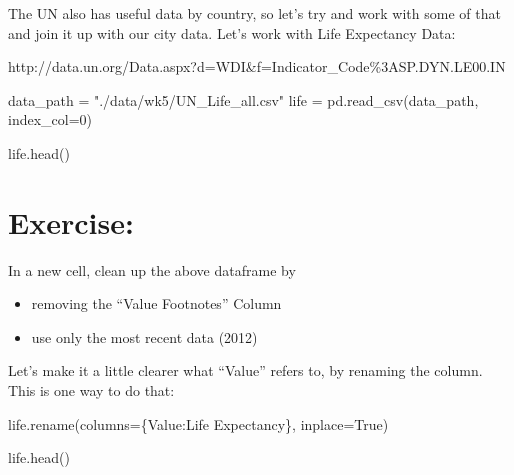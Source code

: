 \documentclass[
  letterpaper,
  DIV=11,
  numbers=noendperiod]{scrreprt}
\newenvironment{Shaded}{\begin{snugshade}}{\end{snugshade}}
\newcommand{\DecValTok}[1]{\textcolor[rgb]{0.68,0.00,0.00}{#1}}
\newcommand{\NormalTok}[1]{\textcolor[rgb]{0.00,0.23,0.31}{#1}}
\newcommand{\OperatorTok}[1]{\textcolor[rgb]{0.37,0.37,0.37}{#1}}
\newcommand{\StringTok}[1]{\textcolor[rgb]{0.13,0.47,0.30}{#1}}
\newcommand{\VariableTok}[1]{\textcolor[rgb]{0.07,0.07,0.07}{#1}}
\providecommand{\tightlist}{%
  \setlength{\itemsep}{0pt}\setlength{\parskip}{0pt}}\usepackage{longtable,booktabs,array}
\begin{document}
The UN also has useful data by country, so let's try and work with some
of that and join it up with our city data. Let's work with Life
Expectancy Data:

http://data.un.org/Data.aspx?d=WDI\&f=Indicator\_Code\%3ASP.DYN.LE00.IN

\begin{Shaded}
\begin{Highlighting}[]
\NormalTok{data\_path }\OperatorTok{=} \StringTok{"./data/wk5/UN\_Life\_all.csv"}
\NormalTok{life }\OperatorTok{=}\NormalTok{ pd.read\_csv(data\_path, index\_col}\OperatorTok{=}\DecValTok{0}\NormalTok{)}
\end{Highlighting}
\end{Shaded}

\begin{Shaded}
\begin{Highlighting}[]
\NormalTok{life.head()}
\end{Highlighting}
\end{Shaded}

\hypertarget{exercise-20}{%
\section{Exercise:}\label{exercise-20}}

In a new cell, clean up the above dataframe by

\begin{itemize}
\tightlist
\item
  removing the ``Value Footnotes'' Column
\item
  use only the most recent data (2012)
\end{itemize}

Let's make it a little clearer what ``Value'' refers to, by renaming the
column. This is one way to do that:

\begin{Shaded}
\begin{Highlighting}[]
\NormalTok{life.rename(columns}\OperatorTok{=}\NormalTok{\{}\StringTok{\textquotesingle{}Value\textquotesingle{}}\NormalTok{:}\StringTok{\textquotesingle{}Life Expectancy\textquotesingle{}}\NormalTok{\}, inplace}\OperatorTok{=}\VariableTok{True}\NormalTok{)}
\end{Highlighting}
\end{Shaded}

\begin{Shaded}
\begin{Highlighting}[]
\NormalTok{life.head()}
\end{Highlighting}
\end{Shaded}
\end{document}
